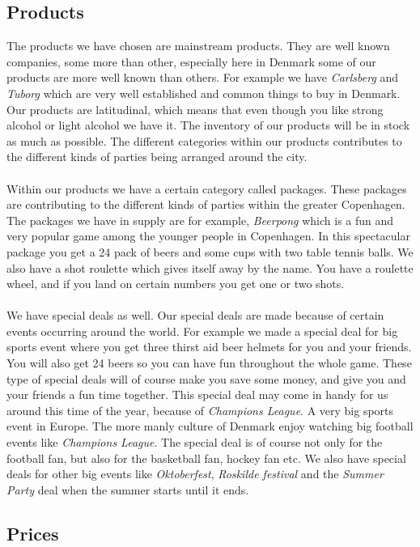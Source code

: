 \documentclass[12p]{article}
\begin{document}
\subsection{Products}

The products we have chosen are mainstream products. They are well known companies, some more than other, especially here in Denmark some of our products are more well known than others. For example we have \emph{Carlsberg} and \emph{Tuborg} which are very well established and common things to buy in Denmark. Our products are latitudinal, which means that even though you like strong alcohol or light alcohol we have it. The inventory of our products will be in stock as much as possible. The different categories within our products contributes to the different kinds of parties being arranged around the city. 
\\ \\
Within our products we have a certain category called packages. These packages are contributing to the different kinds of parties within the greater Copenhagen. The packages we have in supply are for example, \emph{Beerpong} which is a fun and very popular game among the younger people in Copenhagen. In this spectacular package you get a 24 pack of beers and some cups with two table tennis balls. We also have a shot roulette which gives itself away by the name. You have a roulette wheel, and if you land on certain numbers you get one or two shots. 
\\ \\
We have special deals as well. Our special deals are made because of certain events occurring around the world. For example we made a special deal for big sports event where you get three thirst aid beer helmets for you and your friends. You will also get 24 beers so you can have fun throughout the whole game. These type of special deals will of course make you save some money, and give you and your friends a fun time together. This special deal may come in handy for us around this time of the year, because of \emph{Champions League}. A very big sports event in Europe. The more manly culture of Denmark enjoy watching big football events like \emph{Champions League}. The special deal is of course not only for the football fan, but also for the basketball fan, hockey fan etc. We also have special deals for other big events like \emph{Oktoberfest}, \emph{Roskilde festival} and the \emph{Summer Party} deal when the summer starts until it ends. 

\subsection{Prices}
\end{document}
